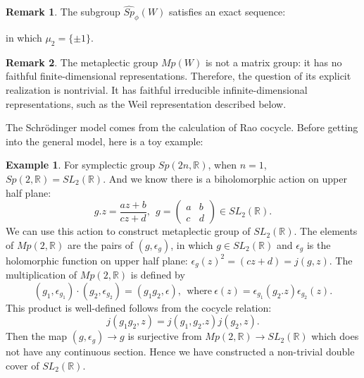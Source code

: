 \documentclass[12pt,a4paper,english]{article}
\theoremstyle{plain}
\theoremstyle{definition}
\newtheorem*{ex}{Example}
\newtheorem*{rem}{Remark}
\begin{document}
\begin{rem}
The subgroup $\hat{Sp}_{\phi}(W)$ satisfies an exact sequence:
\begin{center}
\end{center}
in which $\mu_{2}=\{\pm1\}$.
\end{rem}
\begin{rem}
The metaplectic group $Mp(W)$ is not a matrix group: it has no faithful finite-dimensional representations. Therefore, the question of its explicit realization is nontrivial. It has faithful irreducible infinite-dimensional representations, such as the Weil representation described below.
\end{rem}

 The Schr\"odinger model comes from the calculation of Rao cocycle\cite{kudla1996notes}. Before getting into the general model, here is a toy example:
\begin{ex}
For symplectic group $Sp(2n,\mathbb{R})$, when $n=1$, $Sp(2,\mathbb{R})=SL_{2}(\mathbb{R})$. And we know there is a biholomorphic action on upper half plane: 
\begin{equation*}
    g.z=\frac{az+b}{cz+d},\ \ g=\begin{pmatrix}
    a & b \\
    c & d
    \end{pmatrix}\in SL_{2}(\mathbb{R}).
\end{equation*}
We can use this action to construct metaplectic group of $SL_{2}(\mathbb{R})$. The elements of $Mp(2,\mathbb{R})$ are the pairs of $(g,\epsilon_{g})$, in which $g\in SL_{2}(\mathbb{R})$ and $\epsilon_{g}$ is the holomorphic function on upper half plane: $\epsilon_{g}(z)^{2}=(cz+d)=j(g,z)$. The multiplication of $Mp(2,\mathbb{R})$ is defined by
\begin{equation*}
    (g_{1},\epsilon_{g_{1}})\cdot (g_{2},\epsilon_{g_{2}})=(g_{1}g_{2},\epsilon),\ \ \text{where}\  \epsilon(z)=\epsilon_{g_{1}}(g_{2}.z)\epsilon_{g_{2}}(z).
\end{equation*}
This product is well-defined follows from the cocycle relation:
\begin{equation*}
    j(g_{1}g_{2},z)=j(g_{1},g_{2}.z)j(g_{2},z).
\end{equation*}
Then the map $(g, \epsilon_{g})\rightarrow g$ is surjective from $Mp(2,\mathbb{R})\rightarrow SL_{2}(\mathbb{R})$ which does not have any continuous section. Hence we have constructed a non-trivial double cover of $SL_{2}(\mathbb{R})$.
\end{ex}
\end{document}
